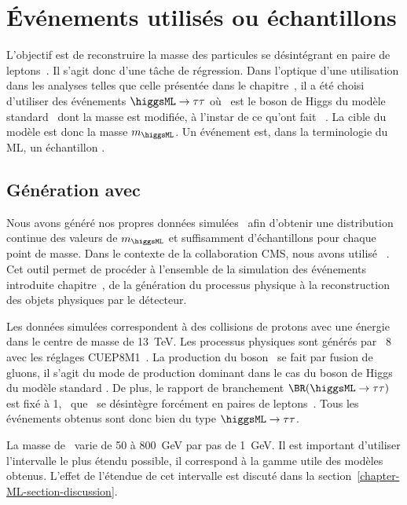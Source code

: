 \section{Événements utilisés ou échantillons}\label{chapter-ML-section-evt_gen}
L'objectif est de reconstruire la masse des particules se désintégrant en paire de leptons~\tau.
Il s'agit donc d'une tâche de régression.
Dans l'optique d'une utilisation dans les analyses telles que celle présentée dans le chapitre~,
il a été choisi d'utiliser des événements
$\higgsML\to\tau\tau$
où \higgsML\ est le boson de Higgs du modèle standard \higgs\ dont la masse est modifiée,
à l'instar de ce qu'ont fait \citeauthor{BARTSCHI201929}~\cite{BARTSCHI201929}.
La cible du modèle est donc la masse $m_{\higgsML}$.
Un événement est, dans la terminologie du ML, un \og échantillon \fg.
\subsection{Génération avec \FASTSIM}\label{chapter-ML-section-evt_gen-FASTSIM}
Nous avons généré nos propres données simulées~\cite{fastsim_ece}
afin d'obtenir
une distribution continue des valeurs de $m_{\higgsML}$
et suffisamment d'échantillons pour chaque point de masse.
Dans le contexte de la collaboration CMS, nous avons utilisé \FASTSIM~\cite{FastSim_2011,FastSim_2014,FastSim_2017_1,FastSim_2017_2}.
Cet outil permet de procéder à l'ensemble de la simulation des événements introduite chapitre~,
de la génération du processus physique à la reconstruction des objets physiques par le détecteur.
\par
Les données simulées correspondent à des collisions de protons
avec une énergie dans le centre de masse de \SI{13}{\TeV}.
Les processus physiques sont générés par
\PYTHIA~8~\cite{pythia8.2}
avec les réglages CUEP8M1~\cite{tunes_2016,tunes_2019}.
La production du boson \higgsML\ se fait par fusion de gluons,
il s'agit du mode de production dominant dans le cas du boson de Higgs du modèle standard \higgs.
De plus, le rapport de branchement $\BR(\higgsML\to\tau\tau)$ est fixé à 1,
\ie\ que \higgsML\ se désintègre forcément en paires de leptons~\tau.
Tous les événements obtenus sont donc bien du type $\higgsML\to\tau\tau$.
\par
La masse de \higgsML\ varie de \num{50} à \SI{800}{\GeV} par pas de \SI{1}{\GeV}.
Il est important d'utiliser l'intervalle le plus étendu possible, il correspond à la gamme utile des modèles obtenus.
L'effet de l'étendue de cet intervalle est discuté dans la section~\ref{chapter-ML-section-discussion}.
